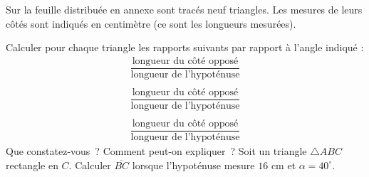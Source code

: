 \documentclass[a4paper,12pt]{article}
\begin{document}
\begin{activite}
	\tcblower
Sur la feuille distribuée en annexe sont tracés neuf triangles. Les mesures de leurs côtés sont indiqués en centimètre (ce sont les longueurs mesurées). 
\begin{tasks}
\task Calculer pour chaque triangle les rapports suivants par rapport à l'angle indiqué : 
\begin{gather*}
	\dfrac{\text{longueur du côté opposé}}{\text{longueur de l'hypoténuse}}\\\\
	\dfrac{\text{longueur du côté opposé}}{\text{longueur de l'hypoténuse}}\\\\
	\dfrac{\text{longueur du côté opposé}}{\text{longueur de l'hypoténuse}}
\end{gather*}
\task Que constatez-vous~? Comment peut-on expliquer~?
\task Soit un triangle $\triangle ABC$ rectangle en $C$. Calculer $\overline{BC}$ lorsque l'hypoténuse mesure $16$ cm et $\alpha=40^\circ$.
\end{tasks}
\end{activite}
\end{document}
